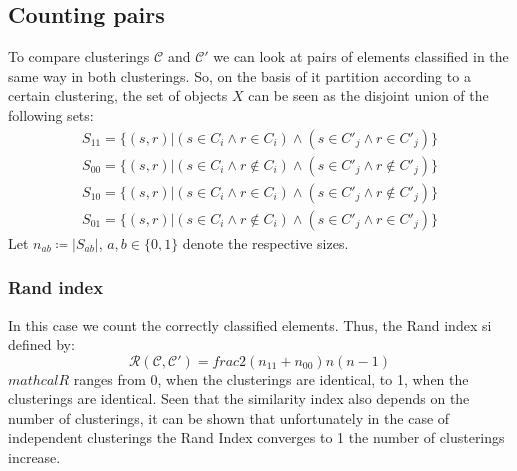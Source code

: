 \subsection{Counting pairs}
To compare clusterings $\mathcal{C}$ and $\mathcal{C}'$ we can look at pairs of elements classified in the same way in both clusterings. So, on the basis of it partition according to a certain clustering, the set of objects $X$ can be seen as the disjoint union of the following sets:
\begin{equation*}
    \begin{gathered}
        S_{11}=\{(s,r)|(s\in C_i\land r\in C_i) \land (s\in C'_j\land r\in C'_j)\}\\
        S_{00}=\{(s,r)|(s\in C_i\land r\notin C_i) \land (s\in C'_j\land r\notin C'_j)\}\\
        S_{10}=\{(s,r)|(s\in C_i\land r\in C_i) \land (s\in C'_j\land r\notin C'_j)\}\\
        S_{01}=\{(s,r)|(s\in C_i\land r\notin C_i) \land (s\in C'_j\land r\in C'_j)\}
    \end{gathered}
\end{equation*}
Let $n_{ab}\coloneqq|S_{ab}|$, $a,b\in\{0,1\}$ denote the respective sizes.
\subsubsection{Rand index}
In this case we count the correctly classified elements. Thus, the Rand index si defined by:
\begin{equation*}
    \mathcal{R}(\mathcal{C},\mathcal{C}')=frac{2(n_{11}+n_{00})}{n(n-1)}
\end{equation*}
$mathcal{R}$ ranges from 0, when the clusterings are identical, to 1, when the clusterings are identical. Seen that the similarity index also depends on the number of clusterings, it can be shown that unfortunately in the case of independent clusterings the Rand Index converges to 1 the number of clusterings increase.

